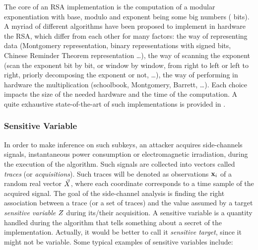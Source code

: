 \begin{remark}
The core of an RSA implementation is the computation of a modular exponentiation with base, modulo and exponent being some big numbers ( bits). A myriad of different algorithms have been proposed to implement in hardware the RSA, which differ from each other for many factors: the way of representing data (\eg Montgomery representation, binary representations with signed bits, Chinese Reminder Theorem representation \dots), the way of scanning the exponent (\eg scan the exponent bit by bit, or window by window, from right to left or left to right, priorly decomposing the exponent or not, \dots), the way of performing in hardware the multiplication (\eg schoolbook, Montgomery, Barrett, \dots). Each choice impacts the size of the needed hardware and the time of the computation. A quite exhaustive state-of-the-art of such implementations is provided in \cite{koc1994high}. 
\end{remark}

\subsubsection{Sensitive Variable}
In order to make inference on such subkeys, an attacker acquires side-channels signals, \eg instantaneous power consumption or electromagnetic irradiation, during the execution of the algorithm. Such signals are collected into vectors called \emph{traces} (or \emph{acquisitions}). Such traces will be denoted as observations $\textbf{x}_i$ of a random real vector $\vec{X}$, where each coordinate corresponds to a time sample of the acquired signal. The goal of the side-channel analysis is finding the right association between a trace (or a set of traces) and the value assumed by a target \emph{sensitive variable} $Z$ during its/their acquisition. A sensitive variable is a quantity handled during the algorithm that tells something about a secret of the implementation. Actually, it would be better to call it \emph{sensitive target}, since it might not be variable. Some typical examples of sensitive variables include: 



